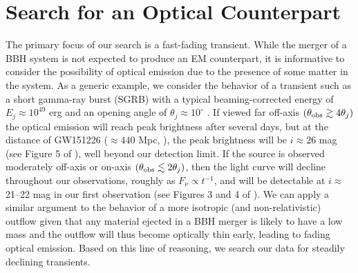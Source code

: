 \section{Search for an Optical Counterpart}
\label{sec:ch4_analysis}
The primary focus of our search is a fast-fading transient.  While the merger of a BBH system is not expected to produce an EM counterpart, it is informative to consider the possibility of optical emission due to the presence of some matter in the system. As a generic example, we consider the behavior of a transient such as a short gamma-ray burst (SGRB) with a typical beaming-corrected energy of $E_j \approx 10^{49}$ erg and an opening angle of $\theta_j\approx 10^\circ$ \citep{Berger2014,Fong+15}. If viewed far off-axis $(\theta_{\rm obs}\gtrsim 4\theta_j)$ the optical emission will reach peak brightness after several days, but at the distance of GW151226 ($\approx440$ Mpc, \citealt{LIGOGW151226}), the peak brightness will be $i\approx 26$ mag (see Figure 5 of \citealt{MetzgerBerger12}), well beyond our detection limit. If the source is observed moderately off-axis or on-axis $(\theta_{\rm obs} \lesssim 2\theta_j)$, then the light curve will decline throughout our observations, roughly as $F_\nu\propto t^{-1}$, and will be detectable at $i\approx$ 21--22 mag in our first observation (see Figures 3 and 4 of \citealt{MetzgerBerger12}). We can apply a similar argument to the behavior of a more isotropic (and non-relativistic) outflow given that any material ejected in a BBH merger is likely to have a low mass and the outflow will thus become optically thin early, leading to fading optical emission. Based on this line of reasoning, we search our data for steadily declining transients.

